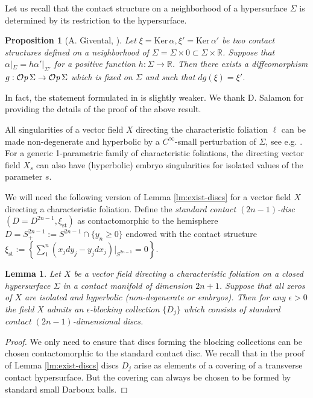 \documentclass[12pt]{amsart}
\theoremstyle{plain}
\newtheorem{lemma}[theorem]{Lemma}
\newtheorem{prop}[theorem]{Proposition}
\theoremstyle{definition}
\theoremstyle{remark}
\newcommand{\R}{\mathbb{R}}
\newcommand{\eps}{\epsilon}
\newcommand{\Ker}{\mathrm{Ker\,}}
\newcommand{\Op}{ {\mathcal O}{\it p}\,}
\newcommand{\st}{\mathrm{st}}
\begin{document}
 Let us recall that the contact structure on a neighborhood of a hypersurface $\Sigma$ is determined by its restriction to the hypersurface.
  \begin{prop}[A. Givental, \cite{AG}]\label{prop:AG}
 Let $\xi=\Ker\alpha, \xi'=\Ker\alpha'$ be two contact structures defined on a neighborhood of $\Sigma=\Sigma\times 0\subset\Sigma\times\R$. Suppose that 
 $\alpha|_{\Sigma}=h \alpha'|_{\Sigma'}$ for a positive function $h:\Sigma\to\R$.
 Then there exists a diffeomorphism $g:\Op\Sigma\to\Op\Sigma$ which  is fixed on $\Sigma$ and such that $dg(\xi)=\xi'$.
 \end{prop}
In fact, the statement formulated in \cite{AG} is slightly weaker. We thank D. Salamon for  providing the details of the proof of the above result.

All singularities of  a vector field $X$  directing the characteristic foliation $\ell$ can be made non-degenerate  and hyperbolic  by a $C^\infty$-small perturbation of $\Sigma$, see e.g. \cite{CE12}.   For a generic 1-parametric family of characteristic foliations, the directing vector field $X_s$ can  also  have (hyperbolic) embryo singularities for isolated values of the parameter $s$.
 
 We will need the following version of Lemma \ref{lm:exist-discs} for a vector field  $X$ directing a characteristic foliation.  Define the {\em standard contact $(2n-1)$-disc} $(D=D^{2n-1},\xi_\st)$ as contactomorphic to the  hemisphere
$D=S^{2n-1}_+:=S^{2n-1}\cap \{y_n\geq 0\}$ endowed with the contact structure $\xi_\st:=\left\{\sum\limits_1^n( x_jdy_j-y_jdx_j)|_{S^{2n-1}}=0\right\}$.  

 
\begin{lemma}\label{lm:exist-discs-cont} Let $X$ be a vector field directing a characteristic foliation on a closed hypersurface $\Sigma$ in a contact manifold of dimension $2n+1$. Suppose that all zeros of $X$ are  isolated and hyperbolic (non-degenerate or embryos).   Then for any $\eps>0$  the field $X$  admits an $\eps$-blocking collection $\{D_j\}$  which consists of standard contact $(2n-1)$-dimensional  discs.
\end{lemma}
\begin{proof} We only need to ensure  that discs forming the blocking collections can be chosen contactomorphic to the standard  contact disc. We recall that in the proof of   Lemma \ref{lm:exist-discs} discs $D_j$  arise as  elements of a covering of a transverse contact hypersurface.  But the covering can  always be  chosen  to be formed   by standard small Darboux balls.
\end{proof}
 
\end{document}
